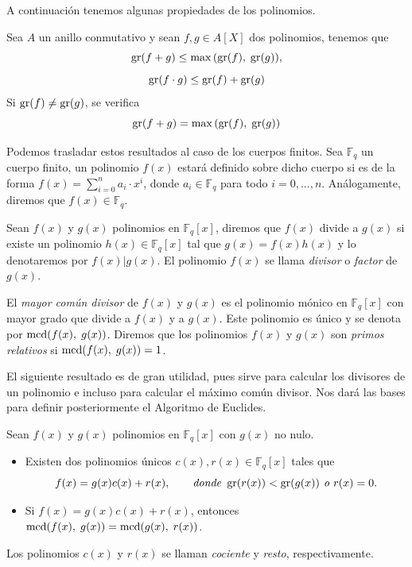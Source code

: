 A continuación tenemos algunas propiedades de los polinomios.

\begin{proposition}
    Sea $A$ un anillo conmutativo y sean $f,g \in A[X]$ dos polinomios, tenemos que 
    $$\operatorname{gr}(f + g) \leq \max{(\operatorname{gr}(f), \; \operatorname{gr}(g))},$$
    $$\operatorname{gr}(f \cdot g) \leq \operatorname{gr}(f) + \operatorname{gr}(g)$$
    Si $\operatorname{gr}(f) \neq \operatorname{gr}(g)$, se verifica 
    $$\operatorname{gr}(f + g) = \max{(\operatorname{gr}(f), \; \operatorname{gr}(g))}$$
\end{proposition}

Podemos trasladar estos resultados al caso de los cuerpos finitos. Sea $\mathbb{F}_q$ un cuerpo finito, un polinomio $f(x)$ estará definido sobre dicho cuerpo si es de la forma $f(x) = \sum_{i = 0}^{n} a_i \cdot x^i$, donde $a_i \in \mathbb{F}_q$ para todo $i = 0, ..., n$. Análogamente, diremos que $f(x) \in \mathbb{F}_q$.

Sean $f(x)$ y $g(x)$ polinomios en $\mathbb{F}_q[x]$, diremos que $f(x)$ divide a $g(x)$ si existe un polinomio $h(x) \in \mathbb{F}_q[x]$ tal que $g(x) = f(x) h(x)$ y lo denotaremos por $f(x) \vert g(x)$. El polinomio $f(x)$ se llama \emph{divisor} o \emph{factor} de $g(x)$.

El \emph{mayor común divisor} de $f(x)$ y $g(x)$ es el polinomio mónico en $\mathbb{F}_q[x]$ con mayor grado que divide a $f(x)$ y a $g(x)$. Este polinomio es único y se denota por $\operatorname{mcd}(f(x), \; g(x))$. Diremos que los polinomios $f(x)$ y $g(x)$ son \emph{primos relativos} si $\operatorname{mcd}(f(x), \; g(x)) = 1$.

El siguiente resultado es de gran utilidad, pues sirve para calcular los divisores de un polinomio e incluso para calcular el máximo común divisor. Nos dará las bases para definir posteriormente el Algoritmo de Euclides.

\begin{theorem}
    \label{th:div_alg}
    Sean $f(x)$ y $g(x)$ polinomios en $\mathbb{F}_q[x]$ con $g(x)$ no nulo.
    \begin{itemize}
        \item Existen dos polinomios únicos $c(x), r(x) \in \mathbb{F}_q[x]$ tales que
        $$f(x) = g(x) c(x) + r(x), \qquad \textit{donde } \operatorname{gr}(r(x)) < \operatorname{gr}(g(x)) \textit{ o } r(x) = 0.$$
        \item Si $f(x) = g(x) c(x) + r(x)$, entonces $\operatorname{mcd}(f(x), \; g(x)) = \operatorname{mcd}(g(x), \; r(x))$.
    \end{itemize}
\end{theorem}

Los polinomios $c(x)$ y $r(x)$ se llaman \emph{cociente} y \emph{resto}, respectivamente.

